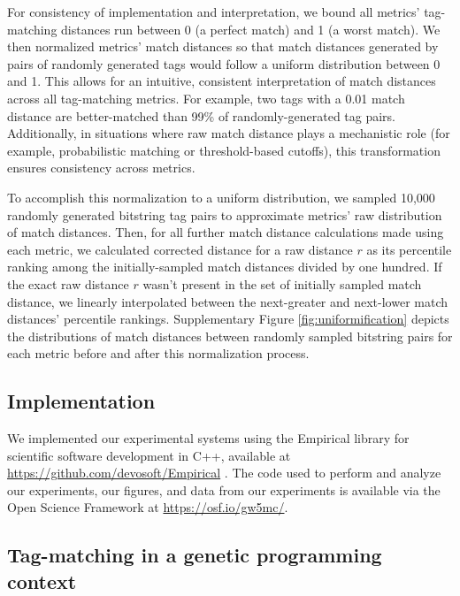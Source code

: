For consistency of implementation and interpretation, we bound all metrics' tag-matching distances run between 0 (a perfect match) and 1 (a worst match).
We then normalized metrics' match distances so that match distances generated by pairs of randomly generated tags would follow a uniform distribution between 0 and 1.
This allows for an intuitive, consistent interpretation of match distances across all tag-matching metrics.
For example, two tags with a 0.01 match distance are better-matched than 99\% of randomly-generated tag pairs.
Additionally, in situations where raw match distance plays a mechanistic role (for example, probabilistic matching or threshold-based cutoffs), this transformation ensures consistency across metrics.

To accomplish this normalization to a uniform distribution, we sampled 10,000 randomly generated bitstring tag pairs to approximate metrics' raw distribution of match distances.
Then, for all further match distance calculations made using each metric, we calculated corrected distance for a raw distance $r$ as its percentile ranking among the initially-sampled match distances divided by one hundred.
If the exact raw distance $r$ wasn't present in the set of initially sampled match distance, we linearly interpolated between the next-greater and next-lower match distances' percentile rankings.
Supplementary Figure \ref{fig:uniformification} depicts the distributions of match distances between randomly sampled bitstring pairs for each metric before and after this normalization process.

\subsection{Implementation}

We implemented our experimental systems using the Empirical library for scientific software development in C++, available at \url{https://github.com/devosoft/Empirical} \citep{charles_ofria_2019_2575607}.
The code used to perform and analyze our experiments, our figures, and data from our experiments is available via the Open Science Framework at \url{https://osf.io/gw5mc/}.

\subsection{Tag-matching in a genetic programming context}

